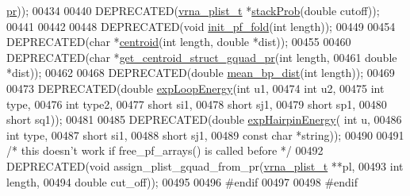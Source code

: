 \begin{DoxyCode}
      \hyperlink{fold__vars_8h_ac98ec419070aee6831b44e5c700f090f}{pr}));
00434 
00440 DEPRECATED(\hyperlink{group__data__structures_structvrna__plist__s}{vrna\_plist\_t} *\hyperlink{part__func_8h_ae856dd7a8d75c471c07153882bf1db48}{stackProb}(\textcolor{keywordtype}{double} cutoff));
00441 
00442 
00448 DEPRECATED(\textcolor{keywordtype}{void} \hyperlink{part__func_8h_a15176e23eceeff8c7d14eabcfec8a2af}{init\_pf\_fold}(\textcolor{keywordtype}{int} length));
00449 
00454 DEPRECATED(\textcolor{keywordtype}{char} *\hyperlink{part__func_8h_ae89a63bd83e75a80b2ba36d20b31ce81}{centroid}(\textcolor{keywordtype}{int} length, \textcolor{keywordtype}{double} *dist));
00455 
00460 DEPRECATED(\textcolor{keywordtype}{char} *\hyperlink{part__func_8h_a4e99e951dfdc006fe56c3a59374378ed}{get\_centroid\_struct\_gquad\_pr}(\textcolor{keywordtype}{int} length,
00461                                   \textcolor{keywordtype}{double} *dist));
00462 
00468 DEPRECATED(\textcolor{keywordtype}{double} \hyperlink{part__func_8h_ae9556ba7ded44fe2321b6f67c3fc02a3}{mean\_bp\_dist}(\textcolor{keywordtype}{int} length));
00469 
00473 DEPRECATED(\textcolor{keywordtype}{double} \hyperlink{part__func_8h_a68ba6f3a48e08ca131ab54621ce3a2d7}{expLoopEnergy}(\textcolor{keywordtype}{int} u1,
00474                                 \textcolor{keywordtype}{int} u2,
00475                                 \textcolor{keywordtype}{int} type,
00476                                 \textcolor{keywordtype}{int} type2,
00477                                 \textcolor{keywordtype}{short} si1,
00478                                 \textcolor{keywordtype}{short} sj1,
00479                                 \textcolor{keywordtype}{short} sp1,
00480                                 \textcolor{keywordtype}{short} sq1));
00481 
00485 DEPRECATED(\textcolor{keywordtype}{double} \hyperlink{part__func_8h_a7b6ab474cc80accc48010ccfcc59f96b}{expHairpinEnergy}( \textcolor{keywordtype}{int} u,
00486                                     \textcolor{keywordtype}{int} type,
00487                                     \textcolor{keywordtype}{short} si1,
00488                                     \textcolor{keywordtype}{short} sj1,
00489                                     \textcolor{keyword}{const} \textcolor{keywordtype}{char} *\textcolor{keywordtype}{string}));
00490 
00491 \textcolor{comment}{/* this doesn't work if free\_pf\_arrays() is called before */}
00492 DEPRECATED(\textcolor{keywordtype}{void} assign\_plist\_gquad\_from\_pr(\hyperlink{group__data__structures_structvrna__plist__s}{vrna\_plist\_t} **pl,
00493                                 \textcolor{keywordtype}{int} length,
00494                                 \textcolor{keywordtype}{double} cut\_off));
00495 
00496 \textcolor{preprocessor}{#endif}
00497 
00498 \textcolor{preprocessor}{#endif}
\end{DoxyCode}
